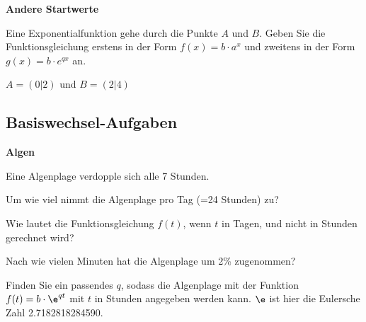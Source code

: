 \platzFuerBerechnungenBisEndeSeite{}



\bbwActAufgabenNr{} \textbf{Andere Startwerte}

Eine Exponentialfunktion gehe durch die Punkte $A$ und $B$. Geben Sie
die Funktionsgleichung erstens in der Form $f(x)=b\cdot{} a^x$ und
zweitens in der Form $g(x)=b\cdot{} e^{qx}$ an.

\begin{bbwAufgabenBlock}
\item $A=(0|2)$ und $B=(2|4)$
\end{bbwAufgabenBlock}


\platzFuerBerechnungenBisEndeSeite{}




\subsection{Basiswechsel-Aufgaben}


\bbwActAufgabenNr{} \textbf{Algen}

Eine Algenplage verdopple sich alle 7 Stunden.

\begin{bbwAufgabenBlock}

\item Um wie viel nimmt die Algenplage pro Tag (=24 Stunden) zu?



\item Wie lautet die Funktionsgleichung $f(t)$, wenn $t$ in Tagen, und nicht in Stunden gerechnet wird?


\item Nach wie vielen Minuten hat die Algenplage um 2\% zugenommen?


\item Finden Sie ein passendes $q$, sodass die Algenplage mit der Funktion $f(t) = b\cdot{}\e^{qt}$ mit $t$ in Stunden angegeben werden kann. $\e$ ist hier die Eulersche Zahl 2.7182818284590.



\end{bbwAufgabenBlock}


\platzFuerBerechnungenBisEndeSeite{}


\newpage
